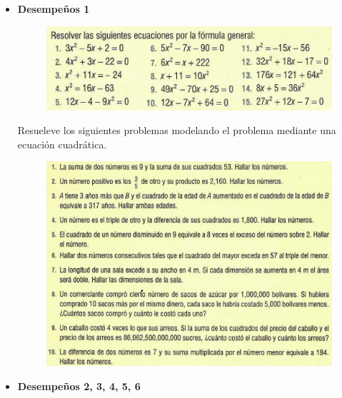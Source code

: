 \documentclass[spanish,12pt,a4paper]{article}
\begin{document}
	\begin{itemize}
		\item \textbf{Desempeños 1}
	
		
		\begin{figure}[h]
			\includegraphics[scale=0.4]{ecuacionescuadraticas.png}
		\end{figure}
	
	
	Resueleve los siguientes problemas modelando el problema mediante una ecuación cuadrática.
	
		\begin{figure}[h!]
			\includegraphics[scale=0.32]{problemas.png}
		\end{figure}
	
	
	
	\newpage
	
		\item \textbf{Desempeños 2, 3, 4, 5, 6}
		
		
		

\end{itemize}
\end{document}
